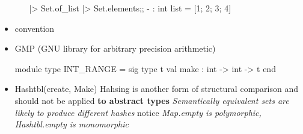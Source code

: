 \begin{itemize}
\begin{itemize}
\begin{alternate}
  [1;2;3;4] |> Set.of_list |> Set.elements;;
  - : int list = [1; 2; 3; 4]
\end{alternate}


  \end{itemize}
\item convention
\item GMP (GNU library for arbitrary precision arithmetic)

\begin{bluecode}
module type INT_RANGE = sig
type t
val make : int -> int -> t
end 
\end{bluecode}


\item Hashtbl(create, Make)
  Hahsing is another form of structural comparison and should not be applied
  {\bf to abstract types}
  \emph{Semantically equivalent sets are likely to produce different hashes}
  notice \textit{Map.empty is polymorphic, Hashtbl.empty is monomorphic}
\end{itemize}


